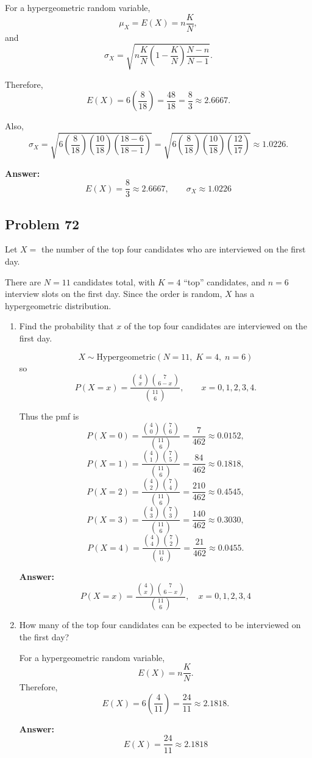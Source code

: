 \documentclass[11pt]{article}
\begin{document}
\begin{enumerate}
    For a hypergeometric random variable,
    \[
    \mu_X=E(X)=n\frac{K}{N},
    \]
    and
    \[
    \sigma_X=\sqrt{n\frac{K}{N}\left(1-\frac{K}{N}\right)\frac{N-n}{N-1}}.
    \]

    Therefore,
    \[
    E(X)=6\left(\frac{8}{18}\right)=\frac{48}{18}=\frac{8}{3}\approx 2.6667.
    \]

    Also,
    \[
    \sigma_X=
    \sqrt{
    6\left(\frac{8}{18}\right)\left(\frac{10}{18}\right)\left(\frac{18-6}{18-1}\right)
    }
    =
    \sqrt{
    6\left(\frac{8}{18}\right)\left(\frac{10}{18}\right)\left(\frac{12}{17}\right)
    }
    \approx 1.0226.
    \]

    \textbf{Answer:}
    \[
    \boxed{E(X)=\frac{8}{3}\approx 2.6667,\qquad \sigma_X\approx 1.0226}
    \]
\end{enumerate}

\subsection*{Problem 72}

Let \(X=\) the number of the top four candidates who are interviewed on the first day.

There are \(N=11\) candidates total, with \(K=4\) ``top'' candidates, and \(n=6\) interview slots on the first day. Since the order is random, \(X\) has a hypergeometric distribution.

\begin{enumerate}
    \item[(a)] Find the probability that \(x\) of the top four candidates are interviewed on the first day.

    \[
    X \sim \mathrm{Hypergeometric}(N=11,\;K=4,\;n=6)
    \]
    so
    \[
    P(X=x)=\frac{\binom{4}{x}\binom{7}{6-x}}{\binom{11}{6}},
    \qquad x=0,1,2,3,4.
    \]

    Thus the pmf is
    \[
    P(X=0)=\frac{\binom{4}{0}\binom{7}{6}}{\binom{11}{6}}=\frac{7}{462}\approx 0.0152,
    \]
    \[
    P(X=1)=\frac{\binom{4}{1}\binom{7}{5}}{\binom{11}{6}}=\frac{84}{462}\approx 0.1818,
    \]
    \[
    P(X=2)=\frac{\binom{4}{2}\binom{7}{4}}{\binom{11}{6}}=\frac{210}{462}\approx 0.4545,
    \]
    \[
    P(X=3)=\frac{\binom{4}{3}\binom{7}{3}}{\binom{11}{6}}=\frac{140}{462}\approx 0.3030,
    \]
    \[
    P(X=4)=\frac{\binom{4}{4}\binom{7}{2}}{\binom{11}{6}}=\frac{21}{462}\approx 0.0455.
    \]

    \textbf{Answer:}
    \[
    \boxed{P(X=x)=\frac{\binom{4}{x}\binom{7}{6-x}}{\binom{11}{6}}, \quad x=0,1,2,3,4}
    \]

    \item[(b)] How many of the top four candidates can be expected to be interviewed on the first day?

    For a hypergeometric random variable,
    \[
    E(X)=n\frac{K}{N}.
    \]
    Therefore,
    \[
    E(X)=6\left(\frac{4}{11}\right)=\frac{24}{11}\approx 2.1818.
    \]

    \textbf{Answer:}
    \[
    \boxed{E(X)=\frac{24}{11}\approx 2.1818}
    \]
\end{enumerate}
\end{document}

